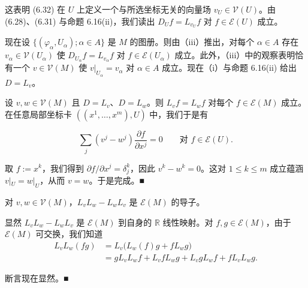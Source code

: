\begin{theorem}
\begin{subitems}
这表明 (6.32) 在 $ U $ 上定义一个与所选坐标无关的向量场 $ v_{U} \in \mathcal{V}(U) $。由 (6.28)、(6.31) 与命题 6.16(ii)，我们读出 $ D_{U} f = L_{v_{U}} f $ 对 $ f \in \mathcal{E}(U) $ 成立。

\item

现在设 $ \{ (\varphi_{\alpha}, U_{\alpha}) ; \alpha \in A \} $ 是 $ M $ 的图册。则由（iii）推出，对每个 $ \alpha \in A $ 存在 $ v_{\alpha} \in \mathcal{V}(U_{\alpha}) $ 使 $ D_{U_{\alpha}} f = L_{v_{\alpha}} f $ 对 $ f \in \mathcal{E}(U_{\alpha}) $ 成立。此外，（iii）中的观察表明恰有一个 $ v \in \mathcal{V}(M) $ 使 $ v|_{U_{\alpha}} = v_{\alpha} $ 对 $ \alpha \in A $ 成立。现在（i）与命题 6.16(ii) 给出 $ D = L_{v} $。

\item

设 $ v, w \in \mathcal{V}(M) $ 且 $ D = L_{v} $、$ D = L_{w} $。则 $ L_{v} f = L_{w} f $ 对每个 $ f \in \mathcal{E}(M) $ 成立。在任意局部坐标卡 $ ((x^{1}, \ldots, x^{m}), U) $ 中，我们于是有

\[
\sum_{j} (v^{j} - w^{j}) \frac{\partial f}{\partial x^{j}} = 0 \qquad \text{对 } f \in \mathcal{E}(U) .
\]

取 $ f := x^{k} $，我们得到 $ \partial f/\partial x^{j} = \delta_{j}^{k} $，因此 $ v^{k} - w^{k} = 0 $。这对 $ 1 \le k \le m $ 成立蕴涵 $ v|_{U} = w|_{U} $，从而 $ v = w $。于是完成。\nobreak\hspace{0.35em}■

\end{subitems}

\end{theorem}

\begin{lemma}

对 $ v, w \in \mathcal{V}(M) $，$ L_{v} L_{w} - L_{w} L_{v} $ 是 $ \mathcal{E}(M) $ 的导子。

\proofhead
显然 $ L_{v} L_{w} - L_{w} L_{v} $ 是 $ \mathcal{E}(M) $ 到自身的 $ \mathbb{R} $ 线性映射。对 $ f, g \in \mathcal{E}(M) $，由于 $ \mathcal{E}(M) $ 可交换，我们知道
\begin{equation*}
\begin{aligned}
L_{v} L_{w}(fg) &= L_{v}\bigl(L_{w}(f) g + f L_{w} g\bigr) \\ &= g L_{v} L_{w} f + L_{v} f L_{w} g + L_{v} g L_{w} f + f L_{v} L_{w} g .
\end{aligned}
\end{equation*}

断言现在显然。\nobreak\hspace{0.35em}■

\end{lemma}

